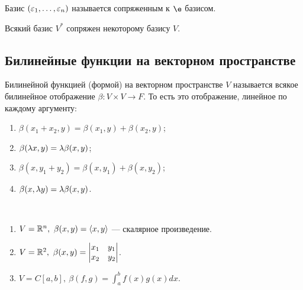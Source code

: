 \begin{Def}
Базис $(\varepsilon_1, \ldots, \varepsilon_n)$ называется сопряженным к $\e$ базисом.
\end{Def}

\begin{Task}
Всякий базис $V^*$ сопряжен некоторому базису $V$.
\end{Task}

\subsection*{Билинейные функции на векторном пространстве}

\begin{Def}
Билинейной функцией (формой) на векторном пространстве $V$ называется всякое билинейное отображение $\beta \colon V \times V \rightarrow F$. То есть это отображение, линейное по каждому аргументу:
\begin{enumerate}
\item $\beta(x_1 + x_2, y) = \beta(x_1, y) + \beta(x_2, y)$; 
\item $\beta(\lambda x, y) = \lambda\beta(x, y)$;
\item $\beta(x, y_1 + y_2) = \beta(x, y_1) + \beta(x, y_2)$;
\item $\beta(x, \lambda y) = \lambda\beta(x, y)$.
\end{enumerate}
\end{Def}

\begin{Examples}\
\begin{enumerate}
\item $V = \mathbb{R}^n,\ \beta(x, y) = \langle x, y \rangle$ --- скалярное произведение. 
\item $V = \mathbb{R}^2,\ \beta(x, y) = \begin{vmatrix}x_1 & y_1 \\ x_2 & y_2\end{vmatrix}$.
\item $V = C[a, b],\ \beta(f, g) = \int_a^bf(x)g(x)dx$.
\end{enumerate}
\end{Examples}
